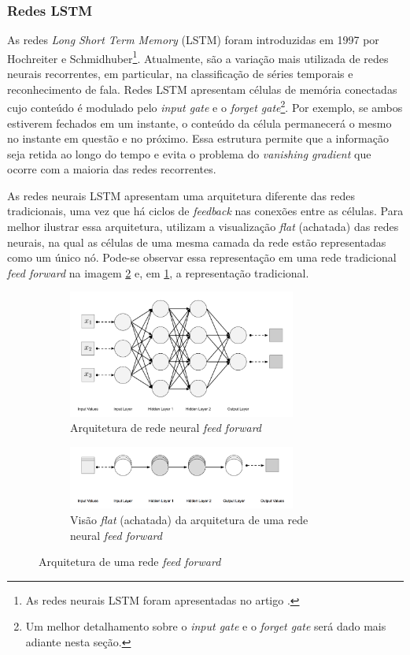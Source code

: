 \subsubsection{Redes LSTM}

As redes \textit{Long Short Term Memory} (LSTM) foram introduzidas em 1997 por Hochreiter 
e Schmidhuber\footnote{As redes neurais LSTM foram apresentadas no artigo \cite{lstm-origem}.}.
Atualmente, são a variação mais utilizada de redes
neurais recorrentes, em particular, na classificação de séries temporais e
reconhecimento de fala. Redes LSTM apresentam células de 
memória conectadas cujo conteúdo é modulado pelo \textit{input gate} e o \textit{forget gate}\footnote{Um 
melhor detalhamento sobre o \textit{input gate} e o \textit{forget gate} será 
dado mais adiante nesta seção.}.
Por exemplo, se ambos estiverem fechados em um instante, o conteúdo da célula permanecerá 
o mesmo no instante em questão e no próximo. Essa estrutura permite que a informação
seja retida ao longo do tempo e evita o problema do \textit{vanishing gradient} que 
ocorre com a maioria das redes recorrentes.

As redes neurais LSTM apresentam uma arquitetura diferente 
das redes tradicionais, uma vez que há ciclos de \textit{feedback}
nas conexões entre as células. Para melhor ilustrar essa 
arquitetura, \cite{dl-oreilly} utilizam a visualização \textit{flat} 
 (achatada) das redes neurais, na qual as células de uma mesma 
camada da rede estão representadas como um único nó.
Pode-se observar essa representação em uma rede tradicional 
\textit{feed forward}
na imagem \ref{fig:arq-ff-flat} e, em
\ref{fig:arq-ff}, a representação 
tradicional.

\begin{figure}[H]
  \centering
  \begin{subfigure}{7.5cm}
      \centering
      \includegraphics[width=7.5cm]{../figuras/redes/arq-ff.png}
      \caption{Arquitetura de rede neural \textit{feed forward}}
      \label{fig:arq-ff}
  \end{subfigure}
  \hfill
  \begin{subfigure}{7.5cm}
      \centering
      \includegraphics[width=7.5cm]{../figuras/redes/arq-ff-flat.png}
      \caption{Visão \textit{flat} (achatada) da arquitetura de uma rede neural \textit{feed forward} }
      \label{fig:arq-ff-flat}
  \end{subfigure}
  \label{fig:comparacao-ff-flat-normal}
  \caption{Arquitetura de uma rede \textit{feed forward}}
\end{figure}

